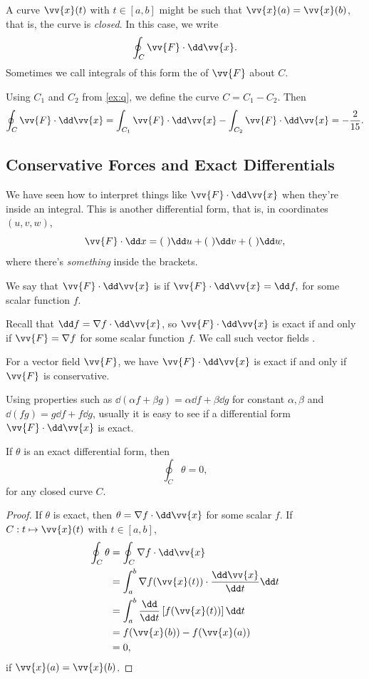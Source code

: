 A curve $\vv{x}(t)$ with $t \in [a, b]$ might be such that $\vv{x}(a) = \vv{x}(b)$, that is, the curve is \emph{closed}. In this case, we write
$$
\oint_C \vv{F} \cdot \dd \vv{x}.
$$
Sometimes we call integrals of this form the  of $\vv{F}$ about $C$.

\begin{example}
	Using $C_1$ and $C_2$ from \autoref{ex:q}, we define the curve $C = C_1 - C_2$. Then
	$$
		\oint_C \vv{F} \cdot \dd \vv{x} = \int_{C_1} \vv{F} \cdot \dd \vv{x} - \int_{C_2} \vv{F} \cdot \dd \vv{x} = - \frac{2}{15}.
	$$
\end{example}

\subsection{Conservative Forces and Exact Differentials}

We have seen how to interpret things like $\vv{F} \cdot \dd \vv{x}$ when they're inside an integral. This is another differential form, that is, in coordinates $(u, v, w)$,
$$
\vv{F} \cdot \dd x = (\ )\dd u + (\ ) \dd v + (\ ) \dd w,
$$
where there's \emph{something} inside the brackets.

\begin{definition}[Exactness]
	We say that $\vv{F} \cdot\dd \vv{x}$ is  if
	$
	\vv{F} \cdot \dd \vv{x} = \dd f,
	$
	for some scalar function $f$.
\end{definition}

Recall that $\dd f = \nabla f \cdot \dd \vv{x}$, so $\vv{F} \cdot \dd \vv{x}$ is exact if and only if $\vv{F} = \nabla f$ for some scalar function $f$. We call such vector fields .


For a vector field $\vv{F}$, we have $\vv{F} \cdot \dd \vv{x}$ is exact if and only if $\vv{F}$ is conservative.

Using properties such as $\dd(\alpha f + \beta g) = \alpha \dd f + \beta \dd g$ for constant $\alpha, \beta$ and $\dd(fg) = g \dd f + f \dd g$, usually it is easy to see if a differential form $\vv{F} \cdot \dd \vv{x}$ is exact.

\begin{proposition}
	If $\theta$ is an exact differential form, then
	$$
	\oint_C \theta = 0,
	$$
	for any closed curve $C$.
\end{proposition}
\begin{proof}
	If $\theta$ is exact, then $\theta = \nabla f \cdot \dd \vv{x}$ for some scalar $f$. If $C: t \mapsto \vv{x}(t)$ with $t \in [a, b]$,
	\begin{align*}
		\oint_C \theta &= \oint_C \nabla f \cdot \dd \vv{x} \\
			&= \int_{a}^b \nabla f(\vv{x}(t)) \cdot \frac{\dd \vv{x}}{\dd t} \dd t \\
			&= \int_a^b \frac{\dd}{\dd t} \left[f(\vv{x}(t))\right] \dd t \\
			&= f(\vv{x}(b)) - f(\vv{x}(a))\\
			&= 0,
	\end{align*}
	if $\vv{x}(a) = \vv{x}(b)$.
\end{proof}

